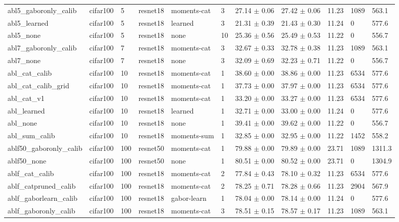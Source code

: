 \begin{tabular}{lllllllllll}
abl5_gaboronly_calib & cifar100 & 5 & resnet18 & moments-cat & 3 & 27.14 $\pm$ 0.06 & 27.42 $\pm$ 0.06 & 11.23 & 1089 & 563.1 \\
abl5_learned & cifar100 & 5 & resnet18 & learned & 3 & 21.31 $\pm$ 0.39 & 21.43 $\pm$ 0.30 & 11.24 & 0 & 577.6 \\
abl5_none & cifar100 & 5 & resnet18 & none & 10 & 25.36 $\pm$ 0.56 & 25.49 $\pm$ 0.53 & 11.22 & 0 & 556.7 \\
abl7_gaboronly_calib & cifar100 & 7 & resnet18 & moments-cat & 3 & 32.67 $\pm$ 0.33 & 32.78 $\pm$ 0.38 & 11.23 & 1089 & 563.1 \\
abl7_none & cifar100 & 7 & resnet18 & none & 3 & 32.09 $\pm$ 0.69 & 32.23 $\pm$ 0.71 & 11.22 & 0 & 556.7 \\
abl_cat_calib & cifar100 & 10 & resnet18 & moments-cat & 1 & 38.60 $\pm$ 0.00 & 38.86 $\pm$ 0.00 & 11.23 & 6534 & 577.6 \\
abl_cat_calib_grid & cifar100 & 10 & resnet18 & moments-cat & 1 & 37.73 $\pm$ 0.00 & 37.97 $\pm$ 0.00 & 11.23 & 6534 & 577.6 \\
abl_cat_v1 & cifar100 & 10 & resnet18 & moments-cat & 1 & 33.20 $\pm$ 0.00 & 33.27 $\pm$ 0.00 & 11.23 & 6534 & 577.6 \\
abl_learned & cifar100 & 10 & resnet18 & learned & 1 & 32.71 $\pm$ 0.00 & 33.00 $\pm$ 0.00 & 11.24 & 0 & 577.6 \\
abl_none & cifar100 & 10 & resnet18 & none & 1 & 39.41 $\pm$ 0.00 & 39.62 $\pm$ 0.00 & 11.22 & 0 & 556.7 \\
abl_sum_calib & cifar100 & 10 & resnet18 & moments-sum & 1 & 32.85 $\pm$ 0.00 & 32.95 $\pm$ 0.00 & 11.22 & 1452 & 558.2 \\
ablf50_gaboronly_calib & cifar100 & 100 & resnet50 & moments-cat & 1 & 79.88 $\pm$ 0.00 & 79.89 $\pm$ 0.00 & 23.71 & 1089 & 1311.3 \\
ablf50_none & cifar100 & 100 & resnet50 & none & 1 & 80.51 $\pm$ 0.00 & 80.52 $\pm$ 0.00 & 23.71 & 0 & 1304.9 \\
ablf_cat_calib & cifar100 & 100 & resnet18 & moments-cat & 2 & 77.84 $\pm$ 0.43 & 78.10 $\pm$ 0.32 & 11.23 & 6534 & 577.6 \\
ablf_catpruned_calib & cifar100 & 100 & resnet18 & moments-cat & 2 & 78.25 $\pm$ 0.71 & 78.28 $\pm$ 0.66 & 11.23 & 2904 & 567.9 \\
ablf_gaborlearn_calib & cifar100 & 100 & resnet18 & gabor-learn & 1 & 78.04 $\pm$ 0.00 & 78.14 $\pm$ 0.00 & 11.24 & 0 & 577.6 \\
ablf_gaboronly_calib & cifar100 & 100 & resnet18 & moments-cat & 3 & 78.51 $\pm$ 0.15 & 78.57 $\pm$ 0.17 & 11.23 & 1089 & 563.1 \\

\end{tabular}
